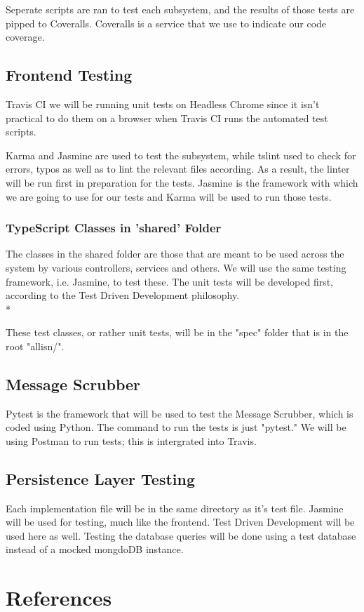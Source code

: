 \documentclass[11pt]{article}
\begin{document}
Seperate scripts are ran to test each subsystem, and the results of those tests are pipped to Coveralls. Coveralls is a service that we use to indicate our code coverage.

\subsection{Frontend Testing}

Travis CI we will be running unit tests on Headless Chrome\cite{Website:3} since it isn't practical to do them on a browser when Travis CI runs the automated test scripts.\par
Karma and Jasmine are used to test the subsystem, while tslint used to check for errors, typos as well as to lint the relevant files according. As a result, the linter will be run first in preparation for the tests. Jasmine is the framework with which we are going to use for our tests and Karma will be used to run those tests.

\subsubsection{TypeScript Classes in 'shared' Folder}

The classes in the shared folder are those that are meant to be used across the system by various controllers, services and others. We will use the same testing framework, i.e. Jasmine, to test these. The unit tests will be developed first, according to the Test Driven Development philosophy.\\*

These test classes, or rather unit tests, will be in the "spec" folder that is in the root "allisn/".

\subsection{Message Scrubber}

Pytest is the framework that will be used to test the Message Scrubber, which is coded using Python. The command to run the tests is just "pytest." We will be using Postman to run tests; this is intergrated into Travis.

\subsection{Persistence Layer Testing}

Each implementation file will be in the same directory as it's test file. Jasmine will be used for testing, much like the frontend. Test Driven Development will be used here as well. Testing the database queries will be done using a test database instead of a mocked mongdoDB instance.

\section{References}


\end{document}
